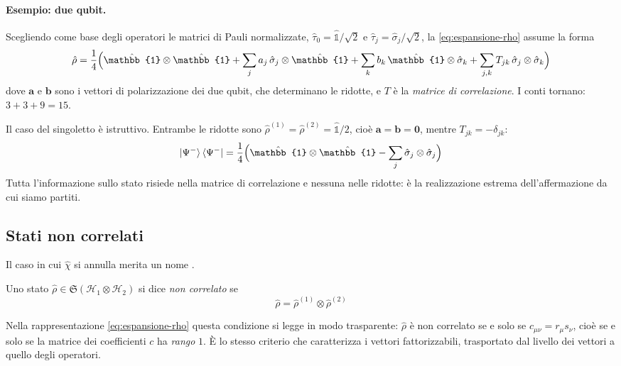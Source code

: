 \paragraph{Esempio: due qubit.}
Scegliendo come base degli operatori le matrici di Pauli normalizzate,
$\hat{\tau}_0 = \hat{\mathbb{1}} / \sqrt{2}$ e $\hat{\tau}_j =
\hat{\sigma}_j / \sqrt{2}$, la \eqref{eq:espansione-rho} assume la forma
%
\begin{equation}
    \hat{\rho} = \frac{1}{4} \Bigl(
    \hat{\mathbb{1}} \otimes \hat{\mathbb{1}}
    + \sum_j a_j \, \hat{\sigma}_j \otimes \hat{\mathbb{1}}
    + \sum_k b_k \, \hat{\mathbb{1}} \otimes \hat{\sigma}_k
    + \sum_{j,k} T_{jk} \, \hat{\sigma}_j \otimes \hat{\sigma}_k \Bigr)
    \label{eq:forma-fano}
\end{equation}
%
dove $\mathbf{a}$ e $\mathbf{b}$ sono i vettori di polarizzazione dei due
qubit, che determinano le ridotte, e $T$ è la \emph{matrice di
correlazione}. I conti tornano: $3 + 3 + 9 = 15$.

Il caso del singoletto è istruttivo. Entrambe le ridotte sono
$\hat{\rho}^{(1)} = \hat{\rho}^{(2)} = \hat{\mathbb{1}}/2$, cioè
$\mathbf{a} = \mathbf{b} = \mathbf{0}$, mentre $T_{jk} = -\delta_{jk}$:
%
\begin{equation}
    \ket{\Psi^-}\bra{\Psi^-} = \frac{1}{4} \Bigl(
    \hat{\mathbb{1}} \otimes \hat{\mathbb{1}}
    - \sum_j \hat{\sigma}_j \otimes \hat{\sigma}_j \Bigr)
    \label{eq:singoletto-fano}
\end{equation}
%
Tutta l'informazione sullo stato risiede nella matrice di correlazione e
nessuna nelle ridotte: è la realizzazione estrema dell'affermazione da
cui siamo partiti.

\subsection{Stati non correlati}

Il caso in cui $\hat{\chi}$ si annulla merita un nome%
.
%
\begin{tcolorbox}[colback=black!5!white, colframe=black!45!white, boxrule=0.8pt]
Uno stato $\hat{\rho} \in \mathfrak{S}(\mathcal{H}_1 \otimes
\mathcal{H}_2)$ si dice \emph{non correlato} se
%
\begin{equation}
    \hat{\rho} = \hat{\rho}^{(1)} \otimes \hat{\rho}^{(2)}
    \label{eq:non-correlato}
\end{equation}
\end{tcolorbox}
%
Nella rappresentazione \eqref{eq:espansione-rho} questa condizione si
legge in modo trasparente: $\hat{\rho}$ è non correlato se e solo se
$c_{\mu\nu} = r_\mu s_\nu$, cioè se e solo se la matrice dei
coefficienti $c$ ha \emph{rango} $1$. È lo stesso criterio che
caratterizza i vettori fattorizzabili, trasportato dal livello dei
vettori a quello degli operatori.

